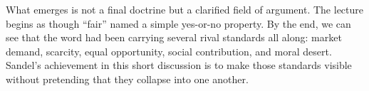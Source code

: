 What emerges is not a final doctrine but a clarified field of argument. The lecture begins as though ``fair'' named a simple yes-or-no property. By the end, we can see that the word had been carrying several rival standards all along: market demand, scarcity, equal opportunity, social contribution, and moral desert. Sandel's achievement in this short discussion is to make those standards visible without pretending that they collapse into one another.